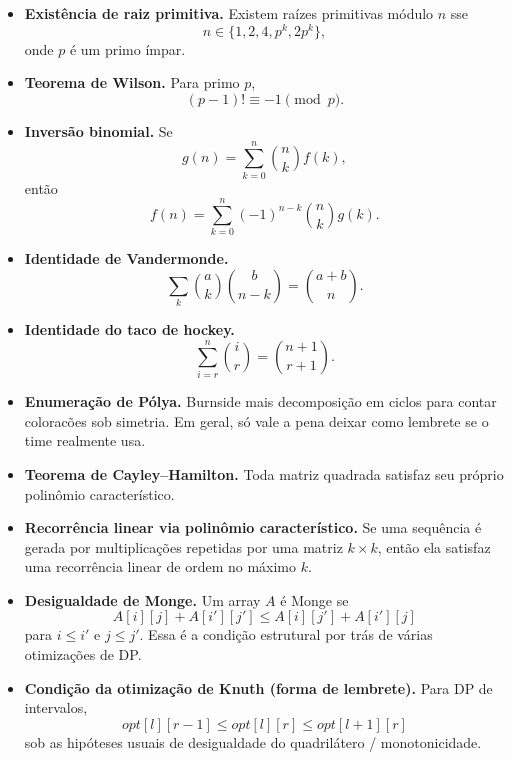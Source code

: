\ifextended

\begin{itemize}[leftmargin=*,label={}]
  \item \textbf{Exist\^encia de raiz primitiva.}
  Existem ra\'izes primitivas m\'odulo $n$ sse
  \[
    n \in \{1,2,4,p^k,2p^k\},
  \]
  onde $p$ \'e um primo \'impar.

  \item \textbf{Teorema de Wilson.}
  Para primo $p$,
  \[
    (p-1)! \equiv -1 \pmod p.
  \]

  \item \textbf{Invers\~ao binomial.}
  Se
  \[
    g(n)=\sum_{k=0}^n \binom{n}{k}f(k),
  \]
  ent\~ao
  \[
    f(n)=\sum_{k=0}^n (-1)^{n-k}\binom{n}{k}g(k).
  \]

  \item \textbf{Identidade de Vandermonde.}
  \[
    \sum_k \binom{a}{k}\binom{b}{n-k} = \binom{a+b}{n}.
  \]

  \item \textbf{Identidade do taco de hockey.}
  \[
    \sum_{i=r}^{n}\binom{i}{r} = \binom{n+1}{r+1}.
  \]

  \item \textbf{Enumera\c{c}\~ao de P\'olya.}
  Burnside mais decomposi\c{c}\~ao em ciclos para contar colorac\~oes sob simetria. Em geral, s\'o vale a pena deixar como lembrete se o time realmente usa.

  \item \textbf{Teorema de Cayley--Hamilton.}
  Toda matriz quadrada satisfaz seu pr\'oprio polin\^omio caracter\'istico.

  \item \textbf{Recorr\^encia linear via polin\^omio caracter\'istico.}
  Se uma sequ\^encia \'e gerada por multiplica\c{c}\~oes repetidas por uma matriz $k\times k$, ent\~ao ela satisfaz uma recorr\^encia linear de ordem no m\'aximo $k$.

  \item \textbf{Desigualdade de Monge.}
  Um array $A$ \'e Monge se
  \[
    A[i][j]+A[i'][j'] \le A[i][j']+A[i'][j]
  \]
  para $i\le i'$ e $j\le j'$.
  Essa \'e a condi\c{c}\~ao estrutural por tr\'as de v\'arias otimiza\c{c}\~oes de DP.

  \item \textbf{Condi\c{c}\~ao da otimiza\c{c}\~ao de Knuth (forma de lembrete).}
  Para DP de intervalos,
  \[
    opt[l][r-1] \le opt[l][r] \le opt[l+1][r]
  \]
  sob as hip\'oteses usuais de desigualdade do quadril\'atero / monotonicidade.


\end{itemize}
